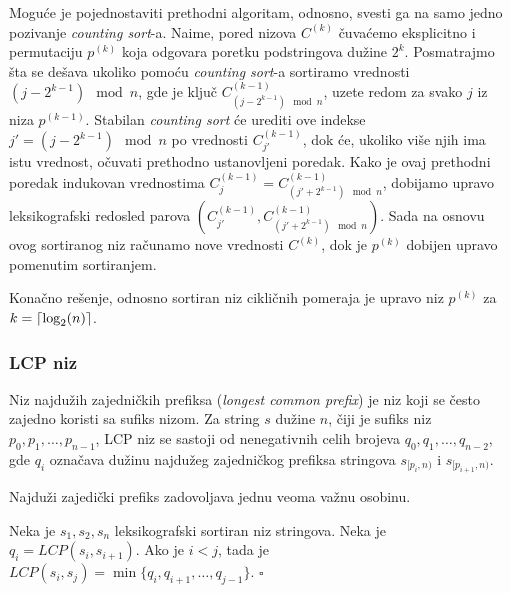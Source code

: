 Mogu\' ce je pojednostaviti prethodni algoritam, odnosno, svesti ga na samo jedno pozivanje \textit{counting sort}-a. Naime, pored nizova $C^{(k)}$ \v cuva\' cemo eksplicitno i permutaciju $p^{(k)}$ koja odgovara poretku podstringova du\v zine $2^k$. Posmatrajmo \v sta se de\v sava ukoliko pomo\' cu \textit{counting sort}-a sortiramo vrednosti $(j - 2^{k-1}) \mod n$, gde je klju\v c $C^{(k-1)}_{(j - 2^{k-1}) \mod n}$, uzete redom za svako $j$ iz niza $p^{(k-1)}$. Stabilan \textit{counting sort} \' ce urediti ove indekse $j' = (j - 2^{k-1}) \mod n$ po vrednosti $C^{(k-1)}_{j'}$, dok \' ce, ukoliko vi\v se njih ima istu vrednost, o\v cuvati prethodno ustanovljeni poredak. Kako je ovaj prethodni poredak indukovan vrednostima $C^{(k-1)}_j = C^{(k-1)}_{(j' + 2^{k-1}) \mod n}$, dobijamo upravo leksikografski redosled parova $(C^{(k-1)}_{j'}, C^{(k-1)}_{(j' + 2^{k-1}) \mod n})$. Sada na osnovu ovog sortiranog niz ra\v cunamo nove vrednosti $C^{(k)}$, dok je $p^{(k)}$ dobijen upravo pomenutim sortiranjem.

Kona\v cno re\v senje, odnosno sortiran niz cikli\v cnih pomeraja je upravo niz $p^{(k)}$ za $k = \left \lceil \log_2(n) \right \rceil$.

\noindent
\begin{minipage}[l]{\textwidth}

\end{minipage}

\subsubsection{LCP niz}

Niz najdu\v zih zajedni\v ckih prefiksa (\textit{longest common prefix}) je niz koji se \v cesto zajedno koristi sa sufiks nizom. Za string $s$ du\v zine $n$, \v ciji je sufiks niz $p_0, p_1, \ldots, p_{n-1}$, LCP niz se sastoji od nenegativnih celih brojeva $q_0, q_1, \ldots, q_{n-2}$, gde $q_i$ ozna\v cava du\v zinu najdu\v zeg zajedni\v ckog prefiksa stringova $s_{[p_i, n)}$ i $s_{[p_{i+1}, n)}$.

Najdu\v zi zajedi\v cki prefiks zadovoljava jednu veoma va\v znu osobinu.

\begin{thm}
\label{lcposobina}
Neka je $s_1, s_2, s_n$ leksikografski sortiran niz stringova. Neka je $q_i = LCP(s_i, s_{i+1})$. Ako je $i<j$, tada je $LCP(s_i, s_j) = \min\{q_i, q_{i+1}, \ldots, q_{j-1}\}$. \hfill $\square$
\end{thm}

